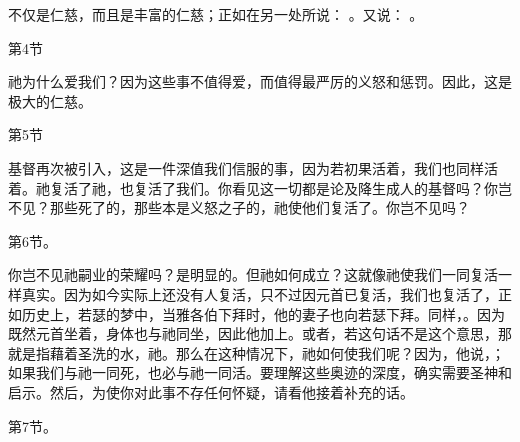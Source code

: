 不仅是仁慈，而且是丰富的仁慈；正如在另一处所说： 。又说： 。\par

第4节  \par

祂为什么爱我们？因为这些事不值得爱，而值得最严厉的义怒和惩罚。因此，这是极大的仁慈。\par

第5节  \par

基督再次被引入，这是一件深值我们信服的事，因为若初果活着，我们也同样活着。祂复活了祂，也复活了我们。你看见这一切都是论及降生成人的基督吗？你岂不见？那些死了的，那些本是义怒之子的，祂使他们复活了。你岂不见吗？\par

第6节。\par

你岂不见祂嗣业的荣耀吗？是明显的。但祂如何成立？这就像祂使我们一同复活一样真实。因为如今实际上还没有人复活，只不过因元首已复活，我们也复活了，正如历史上，若瑟的梦中，当雅各伯下拜时，他的妻子也向若瑟下拜。同样，。因为既然元首坐着，身体也与祂同坐，因此他加上。或者，若这句话不是这个意思，那就是指藉着圣洗的水，祂。那么在这种情况下，祂如何使我们呢？因为，他说，；如果我们与祂一同死，也必与祂一同活。要理解这些奥迹的深度，确实需要圣神和启示。然后，为使你对此事不存任何怀疑，请看他接着补充的话。\par

第7节。\par


